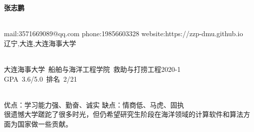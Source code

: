 \documentclass{ctexart}
\begin{document}
\pagestyle{empty}
\begin{center}
    \LARGE \textbf{张志鹏}
\end{center}
\begin{center}
\hrulefill \\
mail:3571669089@qq.com \qquad  phone:19856603328 \qquad website:https://zzp-dmu.github.io \\
辽宁,大连,大连海事大学 \\
\end{center} 
\vspace{0.1in}

 
\begin{center}
    \hrulefill \\
    \mbox{大连海事大学 \qquad 船舶与海洋工程学院 \qquad 救助与打捞工程2020-1 } \\
    \mbox{GPA 3.6/5.0 \quad 排名 2/21} 
\end{center}

\begin{flushleft}
    \hrulefill \\
    \textbullet 优点：学习能力强、勤奋、诚实 \qquad \textbullet 缺点：情商低、马虎、固执\\
    很遗憾大学蹉跎了很多时光，但仍希望研究生阶段在海洋领域的计算软件和算法方面为国家做一些贡献。\\
\end{flushleft}
\end{document}
